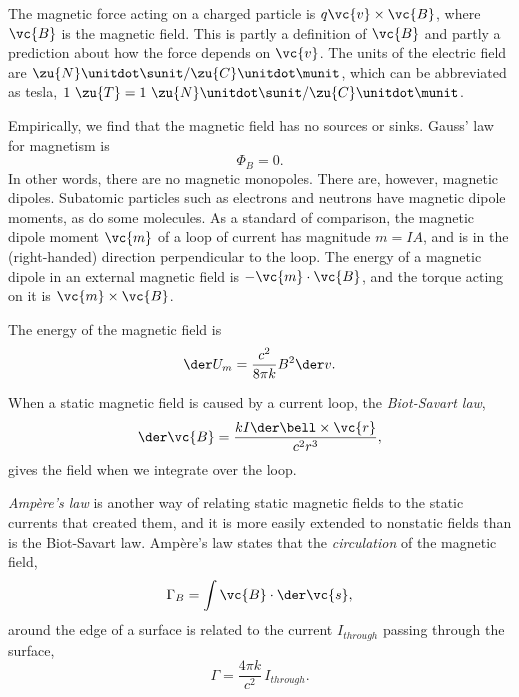 The magnetic force acting on a charged particle is
$q\vc{v}\times\vc{B}$, where $\vc{B}$ is the magnetic field.
This is partly a definition of $\vc{B}$ and partly a prediction
about how the force depends on $\vc{v}$.
The units of the electric field are $\zu{N}\unitdot\sunit/\zu{C}\unitdot\munit$,
which can be abbreviated as tesla, $1\ \zu{T}=1\ \zu{N}\unitdot\sunit/\zu{C}\unitdot\munit$.

Empirically, we find that the magnetic field has no sources or sinks. Gauss' law for
magnetism is
\begin{equation*}
  \Phi_B = 0.
\end{equation*}
In other words, there are no magnetic monopoles. There are, however, magnetic
dipoles. Subatomic particles such as electrons and neutrons have magnetic dipole
moments, as do some molecules. As a standard of comparison, the 
magnetic dipole moment $\vc{m}$ of a loop of current has magnitude
$m=IA$, and is in the (right-handed) direction perpendicular to the loop.
The energy of a magnetic dipole in an external magnetic field is
$-\vc{m}\cdot\vc{B}$, and the torque acting on it is
$\vc{m}\times\vc{B}$.

The energy of the magnetic field is
\begin{equation*}
\der U_m=       \frac{c^2}{8\pi k}B^2 \der v.
\end{equation*}

When a static magnetic field is caused by a current loop,
the \emph{Biot-Savart law},
\begin{equation*}
  \der \vc{B} = \frac{kI\der \bell\times\vc{r}}{c^2r^3},
\end{equation*}
gives the field when we integrate over the loop.

\emph{Amp\`{e}re's law} is another way of relating static magnetic fields to the static currents
that created them, and it is more easily extended to nonstatic fields than is the
Biot-Savart law. Amp\`{e}re's law states that the \emph{circulation} of the magnetic
field,
\begin{equation*}
  \Gamma_B = \int \vc{B}\cdot\der\vc{s},
\end{equation*}
around the edge of a surface is related to the current $I_{through}$ passing through
the surface,
\begin{equation*}
\Gamma = \frac{4\pi k}{c^2}\,I_{through}         .
\end{equation*}

